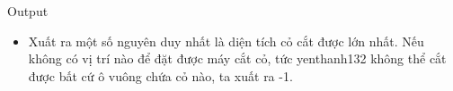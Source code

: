 Output
\begin{itemize}
	\item     Xuất ra một số nguyên duy nhất là diện tích cỏ cắt được lớn nhất. Nếu không có vị trí nào để đặt được máy cắt cỏ, tức    yenthanh132    không thể cắt được bất cứ ô vuông chứa cỏ nào, ta xuất ra -1.   
\end{itemize}